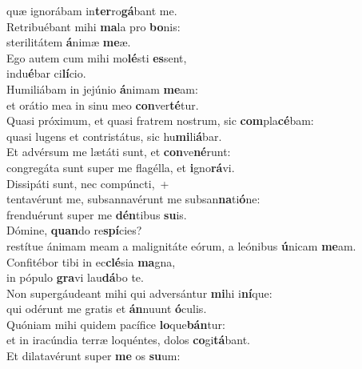 \oddverse quæ ignorábam in\textbf{ter}ro\textbf{gá}bant me.\\
\evenverse Retribuébant mihi \textbf{ma}la pro \textbf{bo}nis:~\*\\
\evenverse sterilitátem \textbf{á}nimæ \textbf{me}æ.\\
\oddverse Ego autem cum mihi mo\textbf{lé}sti \textbf{es}sent,~\*\\
\oddverse indu\textbf{é}bar ci\textbf{lí}cio.\\
\evenverse Humiliábam in jejúnio \textbf{á}nimam \textbf{me}am:~\*\\
\evenverse et orátio mea in sinu meo \textbf{con}ver\textbf{té}tur.\\
\oddverse Quasi próximum, et quasi fratrem nostrum, sic \textbf{com}pla\textbf{cé}bam:~\*\\
\oddverse quasi lugens et contristátus, sic hu\textbf{mi}li\textbf{á}bar.\\
\evenverse Et advérsum me lætáti sunt, et \textbf{con}ve\textbf{né}runt:~\*\\
\evenverse congregáta sunt super me flagélla, et \textbf{i}gno\textbf{rá}vi.\\
\oddverse Dissipáti sunt, nec compúncti,~+\\
\oddverse  tentavérunt me, subsannavérunt me subsan\textbf{na}ti\textbf{ó}ne:~\*\\
\oddverse frenduérunt super me \textbf{dén}tibus \textbf{su}is.\\
\evenverse Dómine, \textbf{quan}do re\textbf{spí}cies?~\*\\
\evenverse restítue ánimam meam a malignitáte eórum, a leónibus \textbf{ú}nicam \textbf{me}am.\\
\oddverse Confitébor tibi in ec\textbf{clé}sia \textbf{ma}gna,~\*\\
\oddverse in pópulo \textbf{gra}vi lau\textbf{dá}bo te.\\
\evenverse Non supergáudeant mihi qui adversántur \textbf{mi}hi i\textbf{ní}que:~\*\\
\evenverse qui odérunt me gratis et \textbf{án}nuunt \textbf{ó}culis.\\
\oddverse Quóniam mihi quidem pacífice \textbf{lo}que\textbf{bán}tur:~\*\\
\oddverse et in iracúndia terræ loquéntes, dolos \textbf{co}gi\textbf{tá}bant.\\
\evenverse Et dilatavérunt super \textbf{me} os \textbf{su}um:~\*\\
